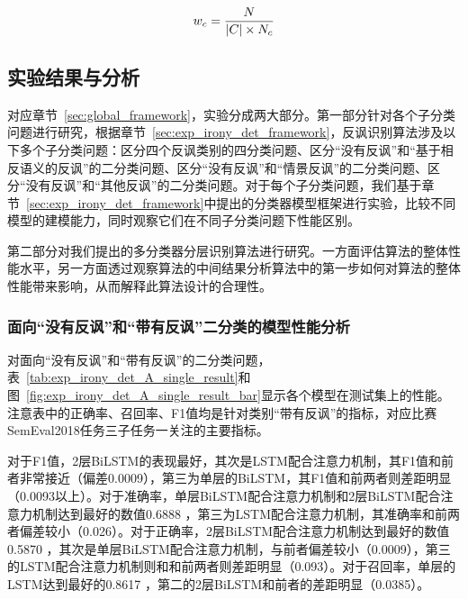 \vspace{-10mm}
\begin{equation}
\vspace{-2.5mm}
\begin{aligned}
    \label{eq:class_weight}
    w_c = \frac{N}{|C| \times N_c}
\end{aligned}
\end{equation}

\subsection{实验结果与分析}

对应章节~\ref{sec:global_framework}，实验分成两大部分。第一部分针对各个子分类问题进行研究，根据章节~\ref{sec:exp_irony_det_framework}，反讽识别算法涉及以下多个子分类问题：区分四个反讽类别的四分类问题、区分“没有反讽”和“基于相反语义的反讽”的二分类问题、区分“没有反讽”和“情景反讽”的二分类问题、区分“没有反讽”和“其他反讽”的二分类问题。对于每个子分类问题，我们基于章节~\ref{sec:exp_irony_det_framework}中提出的分类器模型框架进行实验，比较不同模型的建模能力，同时观察它们在不同子分类问题下性能区别。

第二部分对我们提出的多分类器分层识别算法进行研究。一方面评估算法的整体性能水平，另一方面透过观察算法的中间结果分析算法中的第一步如何对算法的整体性能带来影响，从而解释此算法设计的合理性。

\subsubsection{面向“没有反讽”和“带有反讽”二分类的模型性能分析}
\label{sssec:exp_irony_det_A_base}

对面向“没有反讽”和“带有反讽”的二分类问题，表~\ref{tab:exp_irony_det_A_single_result}和图~\ref{fig:exp_irony_det_A_single_result_bar}显示各个模型在测试集上的性能。注意表中的正确率、召回率、F1值均是针对类别“带有反讽”的指标，对应比赛SemEval2018任务三子任务一关注的主要指标。

对于F1值，2层BiLSTM的表现最好，其次是LSTM配合注意力机制，其F1值和前者非常接近（偏差0.0009），第三为单层的BiLSTM，其F1值和前两者则差距明显（0.0093以上）。对于准确率，单层BiLSTM配合注意力机制和2层BiLSTM配合注意力机制达到最好的数值0.6888 ，第三为LSTM配合注意力机制，其准确率和前两者偏差较小（0.026）。对于正确率，2层BiLSTM配合注意力机制达到最好的数值0.5870 ，其次是单层BiLSTM配合注意力机制，与前者偏差较小（0.0009），第三的LSTM配合注意力机制则和和前两者则差距明显（0.093）。对于召回率，单层的LSTM达到最好的0.8617 ，第二的2层BiLSTM和前者的差距明显（0.0385）。

